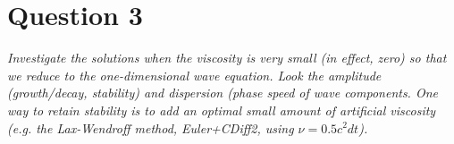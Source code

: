 \section*{Question 3}
\emph{Investigate the solutions when the viscosity is very small (in effect, zero) so that we reduce to the one-dimensional wave equation. Look the amplitude (growth/decay, stability) and dispersion (phase speed of wave components. One way to retain stability is to add an optimal small amount of artificial viscosity (e.g. the Lax-Wendroff method, Euler+CDiff2, using $\nu = 0.5 c^2 dt$).}